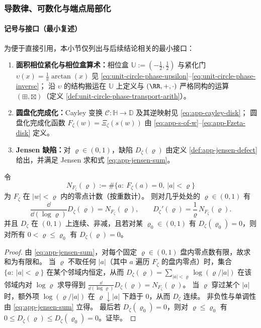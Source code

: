 \subsubsection{导数律、可数化与端点局部化}\label{subsubsec:app-jensen-defect-new-cluster}

\paragraph{记号与接口（最小复述）}
为便于直接引用，本小节仅列出与后续结论相关的最小接口：
\begin{enumerate}
  \item \textbf{面积相位紧化与相位盒算术：}相位盒 \(\mathbb{U}:=(-\tfrac12,\tfrac12)\) 与紧化门 \(\upsilon(x)=\frac{1}{\pi}\arctan(x)\) 见 \eqref{eq:unit-circle-phase-upsilon}--\eqref{eq:unit-circle-phase-inverse}；
  沿 \(\upsilon\) 的结构搬运在 \(\mathbb{U}\) 上定义与 \((\RR,+,\cdot)\) 严格同构的运算 \((\boxplus,\boxtimes)\)（定义 \ref{def:unit-circle-phase-transport-arith}）。
  \item \textbf{圆盘化完成化：}Cayley 变换 \(\mathcal{C}:\mathbb{H}\to\mathbb{D}\) 及其逆映射见 \eqref{eq:app-cayley-disk}；
  圆盘化完成化函数 \(F_{\zeta}(w)=\Xi_{\zeta}(s(w))\) 由 \eqref{eq:app-s-of-w}--\eqref{eq:app-Fzeta-disk} 定义。
  \item \textbf{Jensen 缺陷：}对 \(\varrho\in(0,1)\)，缺陷 \(D_{\zeta}(\varrho)\) 由定义 \ref{def:app-jensen-defect} 给出，并满足 Jensen 求和式 \eqref{eq:app-jensen-sum}。
\end{enumerate}

\begin{proposition}\label{prop:app-jensen-defect-log-derivative}
令
\[
N_{F_{\zeta}}(\varrho)
:=\#\bigl\{a:\ F_{\zeta}(a)=0,\ |a|<\varrho\bigr\}
\]
为 \(F_{\zeta}\) 在 \(|w|<\varrho\) 内的零点计数（按重数计）。
则对几乎处处的 \(\varrho\in(0,1)\) 有
\[
\frac{\dd}{\dd(\log\varrho)}D_{\zeta}(\varrho)=N_{F_{\zeta}}(\varrho),
\qquad
D_{\zeta}'(\varrho)=\frac{1}{\varrho}\,N_{F_{\zeta}}(\varrho).
\]
并且 \(D_{\zeta}\) 在 \((0,1)\) 上连续、非减，且若对某 \(\varrho_0\in(0,1)\) 有 \(D_{\zeta}(\varrho_0)=0\)，则对所有 \(0<\varrho\le \varrho_0\) 有 \(D_{\zeta}(\varrho)=0\)。
\end{proposition}
\begin{proof}
由 \eqref{eq:app-jensen-sum}，对每个固定 \(\varrho\in(0,1)\) 盘内零点数有限，故求和为有限和。
当 \(\varrho\) 不取任何 \(|a|\)（其中 \(a\) 遍历 \(F_{\zeta}\) 的盘内零点）时，集合 \(\{a:\ |a|<\varrho\}\) 在某个邻域内恒定，从而
\(
D_{\zeta}(\varrho)=\sum_{|a|<\varrho}\log(\varrho/|a|)
\)
在该邻域内对 \(\log\varrho\) 求导得到 \(\frac{\dd}{\dd(\log\varrho)}D_{\zeta}(\varrho)=N_{F_{\zeta}}(\varrho)\)。
当 \(\varrho\) 穿过某个 \(|a|\) 时，额外项 \(\log(\varrho/|a|)\) 在 \(\varrho\downarrow |a|\) 下趋于 \(0\)，从而 \(D_{\zeta}\) 连续。
非负性与单调性由 \eqref{eq:app-jensen-sum} 立得。
最后若 \(D_{\zeta}(\varrho_0)=0\)，则对 \(\varrho\le \varrho_0\) 有 \(0\le D_{\zeta}(\varrho)\le D_{\zeta}(\varrho_0)=0\)。证毕。
\end{proof}

